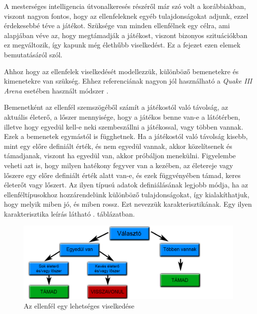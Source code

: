 \label{Chap:viselkedes}

A mesterséges intelligencia útvonalkeresés részéről már szó volt a korábbiakban, viszont nagyon fontos, hogy az ellenfeleknek egyéb tulajdonságokat adjunk, ezzel érdekesebbé téve a játékot. Szüksége van minden ellenfélnek egy célra, ami alapjában véve az, hogy megtámadják a játékost, viszont bizonyos szituációkban ez megváltozik, így kapunk még élethűbb viselkedést. Ez a fejezet ezen elemek bemutatásáról szól.


Ahhoz hogy az ellenfelek viselkedését modellezzük, különböző bemenetekre és kimenetekre van szükség. Ehhez referenciának nagyon jól használható a \textit{Quake III Arena} esetében használt módszer \cite{quakebot}.

Bemenetként az ellenfél szemszögéből számít a játékostól való távolság, az aktuális életerő, a lőszer mennyisége, hogy a játékos benne van-e a látótérben, illetve hogy egyedül kell-e neki szembeszállni a játékossal, vagy többen vannak. Ezek a bemenetek egymástól is függhetnek. Ha a játékostól való távolság kisebb, mint egy előre definiált érték, és nem egyedül vannak, akkor közelítsenek és támadjanak, viszont ha egyedül van, akkor próbáljon menekülni. Figyelembe veheti azt is, hogy milyen hatékony fegyver van a kezében, az életereje vagy lőszere egy előre definiált érték alatt van-e, és ezek függvényében támad, keres életerőt vagy lőszert. Az ilyen típusú adatok definiálásának legjobb módja, ha az ellenféltípusokhoz hozzárendelünk különböző tulajdonságokat, így kialakíthatjuk, hogy melyik miben jó, és miben rossz. Ezt nevezzük karakterisztikának. Egy ilyen karakterisztika leírás látható . táblázatban.

\begin{figure}[h]
\centering
\includegraphics[scale=0.38]{kepek/viselkedes.png}
\caption{Az ellenfél egy lehetséges viselkedése}
\label{fig:behavior}
\end{figure}

